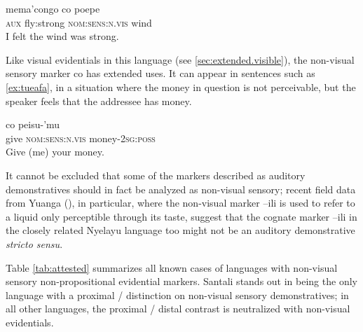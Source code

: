 \documentclass[oneside,a4paper,11pt]{article}
\newcommand{\ipa}[1]{{\phon \mbox{#1}}} %
\begin{document}
\begin{exe}
\ex 
\gll \ipa{mo} \ipa{mema'congo} \ipa{co} \ipa{poepe} \\
\textsc{aux} fly:strong \textsc{nom:sens:n.vis} wind \\
\glt I felt the wind was strong.
\end{exe}

Like visual evidentials in this language (see \ref{sec:extended.visible}), the non-visual sensory marker \ipa{co} has extended uses. It can appear in sentences such as \ref{ex:tueafa}, in a situation where the money in question is not perceivable, but the speaker feels that the addressee has money.

\begin{exe}
\ex  \label{ex:tueafa}
\gll \ipa{tueafa}   \ipa{co} \ipa{peisu-'mu} \\
give \textsc{nom:sens:n.vis} money-\textsc{2sg:poss} \\
\glt Give (me) your money.
\end{exe}

It cannot be excluded that some of the markers described as auditory demonstratives should in fact be analyzed as non-visual sensory; recent field data from Yuanga (\citealt{bril-yuanga}), in particular, where the non-visual marker  \ipa{--ili} is used to refer to a liquid only perceptible through its taste, suggest that the cognate marker \ipa{--ili} in the closely related Nyelayu language too might not be an auditory demonstrative \textit{stricto sensu}.


Table \ref{tab:attested} summarizes all known cases of languages with non-visual sensory non-propositional evidential markers.  Santali stands out in being the only language with a proximal / distinction on non-visual sensory demonstratives; in all other languages, the proximal / distal contrast is neutralized with non-visual evidentials. 

\begin{table}[H]
\caption{Non-propositional evidential systems with non-visual sensory evidentials } \label{tab:attested}
\end{table}	
 
\end{document}
